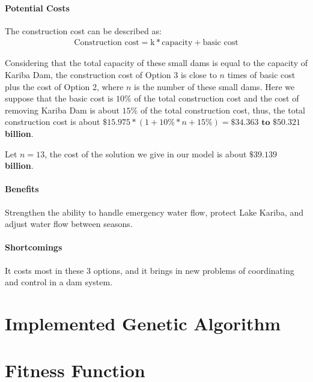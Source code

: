 \documentclass{mcmthesis}
\begin{document}
\paragraph{Potential Costs}
The construction cost can be described as:
\begin{align*}
\text{Construction cost} = \text{k}*\text{capacity} + \text{basic cost}
\end{align*}

Considering that the total capacity of these small dams is equal to the capacity of Kariba Dam, the construction cost of Option 3 is close to $n$ times of basic cost plus the cost of Option 2, where $n$ is the number of these small dams. Here we suppose that the basic cost is $10\%$ of the total construction cost and the cost of removing Kariba Dam is about $15\%$ of the total construction cost, thus, the total construction cost is about $\$15.975 * (1+10\%*n+15\%) = \mathbf{\$34.363} \textbf{ to } \mathbf{\$50.321}$ \textbf{billion}.

Let $n =13$, the cost of the solution we give in our model is about $\mathbf{\$39.139}$ \textbf{billion}.
\paragraph{Benefits}
Strengthen the ability to handle emergency water flow, protect Lake Kariba, and adjust water flow between seasons.
\paragraph{Shortcomings}
It costs most in these 3 options, and it brings in new problems of coordinating and control in a dam system.
	
	
	
	
	
\newpage

\begin{appendices}

\section{Implemented Genetic Algorithm}

%
\section{Fitness Function}
%
\end{appendices}
\end{document}
